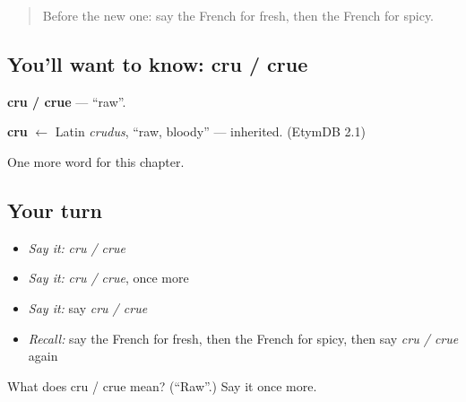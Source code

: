 \label{lesson:FR-C161-cru-crue}



\begin{quote}
Before the new one: say the French for fresh, then the French for spicy.
\end{quote}

\subsection*{You'll want to know: cru / crue}
\textbf{cru / crue} — \textquotedblleft{}raw\textquotedblright{}.

\begin{cousinweb}
\textbf{cru} $\leftarrow$ Latin \emph{crudus}, \textquotedblleft{}raw, bloody\textquotedblright{} — inherited. (EtymDB 2.1)
\end{cousinweb}

\begin{grammarlens}[title={What you've built}]
One more word for this chapter.
\end{grammarlens}

\subsection*{Your turn}
\begin{itemize}
\raggedright
  \item \emph{Say it:} \emph{cru / crue}
  \item \emph{Say it:} \emph{cru / crue}, once more
  \item \emph{Say it:} say \emph{cru / crue}
  \item \emph{Recall:} say the French for fresh, then the French for spicy, then say \emph{cru / crue} again
\end{itemize}

\begin{tcolorbox}[breakable,colback=teal!4,colframe=teal!35!black,title={Before you move on}]
What does cru / crue mean? (\textquotedblleft{}Raw\textquotedblright{}.) Say it once more.
\end{tcolorbox}
